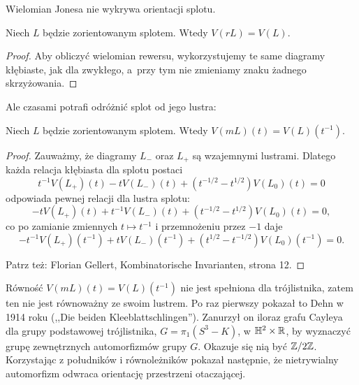 Wielomian Jonesa nie wykrywa orientacji splotu.

\begin{proposition}
    Niech $L$ będzie zorientowanym splotem.
    Wtedy $V(rL)=V(L)$.
\end{proposition}

\begin{proof}
    Aby obliczyć wielomian rewersu, wykorzystujemy te same diagramy kłębiaste,
    jak dla zwykłego, a~przy tym nie zmieniamy znaku żadnego skrzyżowania.
\end{proof}

Ale czasami potrafi odróżnić splot od jego lustra:

\begin{proposition}
    Niech $L$ będzie zorientowanym splotem.
    Wtedy $V(mL)(t)=V(L)(t^{-1})$.
\end{proposition}

\begin{proof}
    Zauważmy, że diagramy $L_-$ oraz $L_+$ są wzajemnymi lustrami.
    Dlatego każda relacja kłębiasta dla splotu postaci
    \begin{equation}
        t^{-1} V(L_+)(t) - tV(L_-)(t) + (t^{-1/2} - t^{1/2}) V(L_0)(t) = 0
    \end{equation}
    odpowiada pewnej relacji dla lustra splotu:
    \begin{equation}
        -tV(L_+)(t) + t^{-1} V(L_-)(t) + (t^{-1/2} - t^{1/2}) V(L_0)(t) = 0,
    \end{equation}
    co po zamianie zmiennych $t \mapsto t^{-1}$ i przemnożeniu przez $-1$ daje
    \begin{equation}
        -t^{-1} V(L_+)(t^{-1}) + t V(L_-)(t^{-1}) + (t^{1/2} - t^{-1/2}) V(L_0)(t^{-1}) = 0.
    \end{equation}

    Patrz też: Florian Gellert, Kombinatorische Invarianten, strona 12.
\end{proof}

Równość $V(mL)(t)=V(L)(t^{-1})$ nie jest spełniona dla trójlistnika, zatem ten nie jest równoważny ze swoim lustrem.
Po raz pierwszy pokazał to Dehn w 1914 roku (,,Die beiden Kleeblattschlingen'').
Zanurzył on iloraz grafu Cayleya dla grupy podstawowej trójlistnika, $G = \pi_1(S^3 - K)$, w $\mathbb H^2 \times \mathbb R$, by wyznaczyć grupę zewnętrznych automorfizmów grupy $G$.
Okazuje się nią być $\mathbb Z/2\mathbb Z$.
Korzystając z południków i równoleżników pokazał następnie, że nietrywialny automorfizm odwraca orientację przestrzeni otaczającej.

